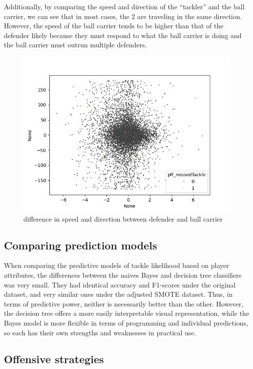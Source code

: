 \documentclass[bibtex, sigconf, hyperref={colorlinks=true,linkcolor=blue,urlcolor=blue}]{acmart}
\begin{document}
Additionally, by comparing the speed and direction of the ``tackler'' and the
ball carrier, we can see that in most cases, the 2 are traveling in the same
direction. However, the speed of the ball carrier tends to be higher than that
of the defender likely because they must respond to what the ball carrier is
doing and the ball carrier must outrun multiple defenders.
\begin{figure}[h]
  \centering
  \includegraphics[width=\linewidth]{speed}
  \caption{difference in speed and direction between defender and ball carrier}
\end{figure}

\subsection{Comparing prediction models}


When comparing the predictive models of tackle likelihood based on player attributes,
the differences between the naives Bayes and decision tree classifiers was very small.
They had identical accuracy and F1-scores under the original dataset, and very similar ones
under the adjusted SMOTE dataset. Thus, in terms of predictive power, neither is necessarily
better than the other. However, the decision tree offers a more easily interpretable
visual representation, while the Bayes model is more flexible in terms of programming and
individual predictions, so each has their own strengths and weaknesses in practical use.

\subsection{Offensive strategies}
\end{document}
